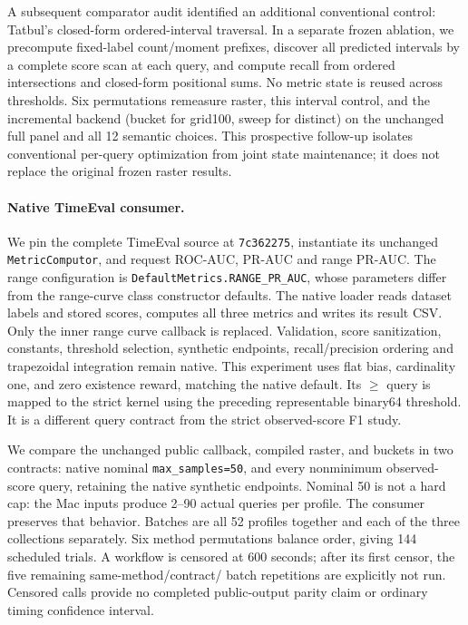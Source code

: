 A subsequent comparator audit identified an additional conventional control:
Tatbul's closed-form ordered-interval traversal. In a separate frozen ablation,
we precompute fixed-label count/moment prefixes, discover all predicted
intervals by a complete score scan at each query, and compute recall from
ordered intersections and closed-form positional sums. No metric state is
reused across thresholds. Six permutations remeasure raster, this interval
control, and the incremental backend (bucket for grid100, sweep for distinct)
on the unchanged full panel and all 12 semantic choices. This prospective
follow-up isolates conventional per-query optimization from joint state
maintenance; it does not replace the original frozen raster results.

\paragraph{Native TimeEval consumer.}
We pin the complete TimeEval source at \texttt{7c362275}, instantiate its
unchanged \texttt{MetricComputor}, and request ROC-AUC, PR-AUC and range PR-AUC.
The range configuration is \texttt{DefaultMetrics.RANGE\_PR\_AUC}, whose
parameters differ from the range-curve class constructor defaults.
The native loader reads dataset labels and stored scores, computes all three
metrics and writes its result CSV. Only the inner range curve callback is
replaced. Validation, score sanitization, constants, threshold selection,
synthetic endpoints, recall/precision ordering and trapezoidal integration
remain native. This experiment uses flat bias, cardinality one, and zero
existence reward, matching the native default. Its $\ge$ query is mapped to
the strict kernel using the preceding representable binary64 threshold.
It is a different query contract from the strict observed-score F1 study.

We compare the unchanged public callback, compiled raster, and buckets in
two contracts: native nominal \texttt{max\_samples=50}, and every nonminimum
observed-score query, retaining the native synthetic endpoints.
Nominal 50 is not a hard cap: the Mac inputs produce 2--90 actual
queries per profile. The consumer preserves that behavior. Batches are all 52
profiles together and each of the three collections separately. Six method
permutations balance order, giving 144 scheduled trials. A workflow is censored
at 600 seconds; after its first censor, the five remaining same-method/contract/
batch repetitions are explicitly not run. Censored calls provide no completed
public-output parity claim or ordinary timing confidence interval.

